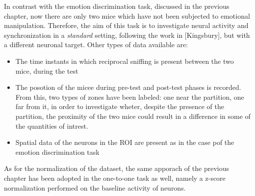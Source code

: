 \documentclass[a4paper]{article}
\begin{document}
In contrast with the emotion discrimination task, discussed in the previous chapter, now there are only two mice which have not been subjected to emotional manipulation. Therefore, the aim of this task is to investigate neural activity and synchronization in a \textit{standard} setting, following the work in [Kingsbury], but with a different neuronal target. Other types of data available are:

\begin{itemize}
	\item The time instants in which reciprocal sniffing is present between the two mice, during the test
	\item The posotion of the micee during pre-test and post-test phases is recorded. From this, two types of zones have been labeled: one near the partition, one far from it, in order to investigate wheter, despite the presence of the partition, the proximity of the two mice could result in a difference in some of the quantities of intrest.
	
	\item Spatial data of the neurons in the ROI are present as in the case pof the emotion discrimination task
\end{itemize}

As for the normalization of the dataset, the same apporach of the previous chapter has been adopted in the one-to-one task as well, namely a z-score normalization performed on the baseline activity of neurons.
\end{document}
